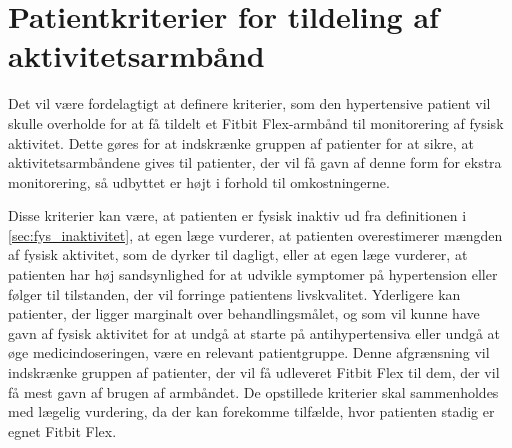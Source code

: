 \section{Patientkriterier for tildeling af aktivitetsarmbånd} \label{sec:kriterier}

Det vil være fordelagtigt at definere kriterier, som den hypertensive patient vil skulle overholde for at få tildelt et Fitbit Flex-armbånd til monitorering af fysisk aktivitet. Dette gøres for at indskrænke gruppen af patienter for at sikre, at aktivitetsarmbåndene gives til patienter, der vil få gavn af denne form for ekstra monitorering, så udbyttet er højt i forhold til omkostningerne. 

Disse kriterier kan være, at patienten er fysisk inaktiv ud fra definitionen i \autoref{sec:fys_inaktivitet}, at egen læge vurderer, at patienten overestimerer mængden af fysisk aktivitet, som de dyrker til dagligt, eller at egen læge vurderer, at patienten har høj sandsynlighed for at udvikle symptomer på hypertension eller følger til tilstanden, der vil forringe patientens livskvalitet. Yderligere kan patienter, der ligger marginalt over behandlingsmålet, og som vil kunne have gavn af fysisk aktivitet for at undgå at starte på antihypertensiva eller undgå at øge medicindoseringen, være en relevant patientgruppe. Denne afgrænsning vil indskrænke gruppen af patienter, der vil få udleveret Fitbit Flex til dem, der vil få mest gavn af brugen af armbåndet. 
De opstillede kriterier skal sammenholdes med lægelig vurdering, da der kan forekomme tilfælde, hvor patienten stadig er egnet Fitbit Flex. 

